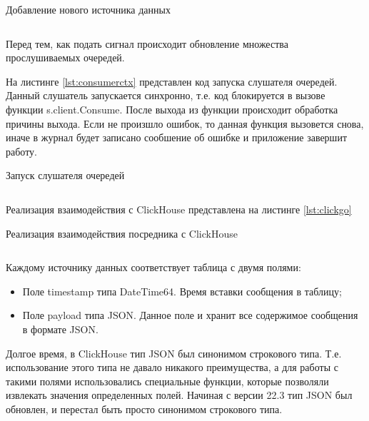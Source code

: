 \documentclass[14pt, russian]{scrartcl}
\begin{document}
\begin{listing}[H]
	\caption{Добавление нового источника данных}
	\label{lst:ctxclosing}
	\inputminted[style=bw, frame=single,fontsize = \footnotesize, linenos=false, xleftmargin = 1.5em]{shell}{./listings/contextclose.go}
\end{listing}

Перед тем, как подать сигнал происходит обновление множества
прослушиваемых очередей.

На листинге \ref{lst:consumerctx} представлен код запуска слушателя очередей.
Данный слушатель запускается синхронно, т.е. код блокируется в 
вызове функции s.client.Consume. После выхода 
из функции происходит обработка причины выхода. Если 
не произшло ошибок, то данная функция вызовется снова, иначе
в журнал будет записано сообшение об ошибке и приложение завершит работу.

\begin{listing}[H]
	\caption{Запуск слушателя очередей}
	\label{lst:consumerctx}
	\inputminted[style=bw, frame=single,fontsize = \footnotesize, linenos=false, xleftmargin = 1.5em]{shell}{./listings/consumerctx.go}
\end{listing}


Реализация взаимодействия с ClickHouse представлена на листинге \ref{lst:clickgo} 

\begin{listing}[H]
	\caption{Реализация взаимодействия посредника с ClickHouse}
	\label{lst:clickgo}
	\inputminted[style=bw, frame=single,fontsize = \footnotesize, linenos=false, xleftmargin = 1.5em]{golang}{./listings/clickgo.go}
\end{listing}

Каждому источнику данных соответствует таблица с двумя полями:

\begin{itemize}
  \item Поле timestamp типа DateTime64. Время вставки сообщения в таблицу;
  \item Поле payload типа JSON. Данное поле и хранит все содержимое сообщения в формате JSON.
\end{itemize}

Долгое время, в ClickHouse тип JSON был синонимом строкового типа. Т.е. использование этого типа 
не давало никакого преимущества, а для работы с такими полями использовались специальные функции, которые 
позволяли извлекать значения определенных полей.
Начиная с версии 22.3 тип JSON был обновлен, и перестал быть просто синонимом строкового типа.
\end{document}
